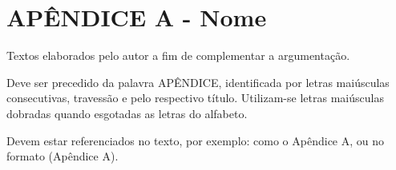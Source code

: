 \appendix

\chapter*{APÊNDICE A - Nome}

Textos elaborados pelo autor a fim de complementar a argumentação.

Deve ser precedido da palavra APÊNDICE, identificada por letras maiúsculas consecutivas, travessão e pelo respectivo título. Utilizam-se letras maiúsculas dobradas quando esgotadas as letras do alfabeto.

Devem estar referenciados no texto, por exemplo: como o Apêndice A, ou no formato (Apêndice A).
